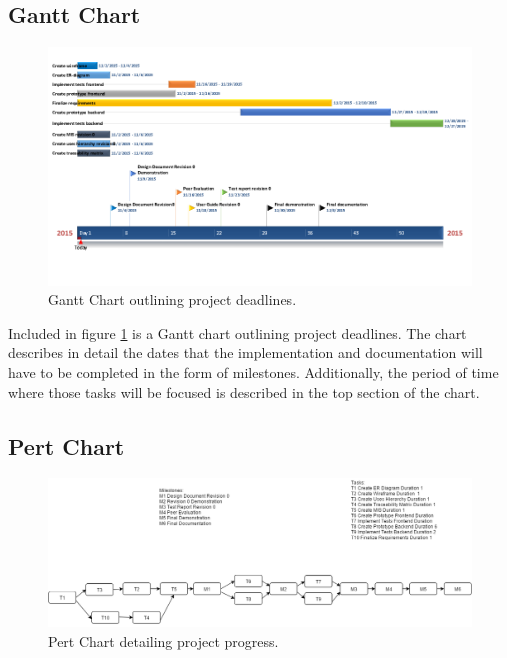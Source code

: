 \documentclass{article}
\begin{document}
\subsection*{Gantt Chart}
\begin{figure}
\includegraphics[scale=0.5]{gantt_chart}
\caption{Gantt Chart outlining project deadlines.}
\label{gantt}
\end{figure}

Included in figure \ref{gantt} is a Gantt chart outlining project deadlines. The chart describes in detail the dates that the implementation and documentation will have to be completed in the form of milestones. Additionally, the period of time where those tasks will be focused is described in the top section of the chart.

\subsection*{Pert Chart}
\begin{figure}
\includegraphics[scale=0.4]{pertchart}
\caption{Pert Chart detailing project progress.}
\label{pert}
\end{figure}
\end{document}
